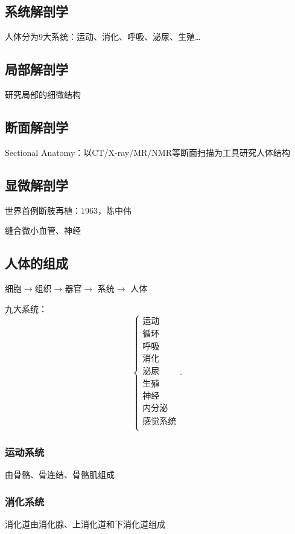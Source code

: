 \subsection{系统解剖学}%
\label{sub:系统解剖学}
人体分为9大系统：运动、消化、呼吸、泌尿、生殖\ldots
\subsection{局部解剖学}%
\label{sub:局部解剖学}
研究局部的细微结构
\subsection{断面解剖学}%
\label{sub:断面解剖学}
Sectional Anatomy：以CT/X-ray/MR/NMR等断面扫描为工具研究人体结构
\subsection{显微解剖学}%
\label{sub:显微解剖学}
\begin{notation}
    世界首例断肢再植：1963，陈中伟
\end{notation}
缝合微小血管、神经

\subsection{人体的组成}%
\label{sub:人体的组成}
细胞$\to $组织$\to $器官$\to $ 系统$\to $ 人体

九大系统：
\[
    \begin{cases}
        \mbox{运动}\\
        \mbox{循环}\\
        \mbox{呼吸}\\
        \mbox{消化}\\
        \mbox{泌尿}\\
        \mbox{生殖}\\
        \mbox{神经}\\
        \mbox{内分泌}\\
        \mbox{感觉系统}\\
    \end{cases}
.\] 
\subsubsection{运动系统}%
\label{subsub:运动系统}
由骨骼、骨连结、骨骼肌组成
\subsubsection{消化系统}%
\label{subsub:消化系统}
消化道由消化腺、上消化道和下消化道组成
